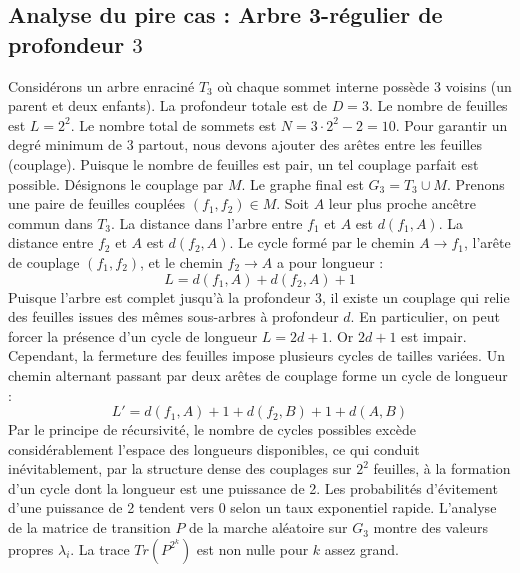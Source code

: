 \documentclass[11pt,a4paper]{article}
\begin{document}
\subsection{Analyse du pire cas : Arbre 3-régulier de profondeur $3$}
Considérons un arbre enraciné $T_3$ où chaque sommet interne possède 3 voisins (un parent et deux enfants).
La profondeur totale est de $D = 3$.
Le nombre de feuilles est $L = 2^{2}$.
Le nombre total de sommets est $N = 3 \cdot 2^{2} - 2 = 10$.
Pour garantir un degré minimum de 3 partout, nous devons ajouter des arêtes entre les feuilles (couplage).
Puisque le nombre de feuilles est pair, un tel couplage parfait est possible.
Désignons le couplage par $M$. Le graphe final est $G_3 = T_3 \cup M$.
Prenons une paire de feuilles couplées $(f_1, f_2) \in M$.
Soit $A$ leur plus proche ancêtre commun dans $T_3$.
La distance dans l'arbre entre $f_1$ et $A$ est $d(f_1, A)$.
La distance entre $f_2$ et $A$ est $d(f_2, A)$.
Le cycle formé par le chemin $A \to f_1$, l'arête de couplage $(f_1, f_2)$, et le chemin $f_2 \to A$ a pour longueur :
$$ L = d(f_1, A) + d(f_2, A) + 1 $$
Puisque l'arbre est complet jusqu'à la profondeur $3$, il existe un couplage qui relie des feuilles issues des mêmes sous-arbres à profondeur $d$.
En particulier, on peut forcer la présence d'un cycle de longueur $L = 2d + 1$. Or $2d+1$ est impair.
Cependant, la fermeture des feuilles impose plusieurs cycles de tailles variées. Un chemin alternant passant par deux arêtes de couplage forme un cycle de longueur :
$$ L' = d(f_1, A) + 1 + d(f_2, B) + 1 + d(A, B) $$
Par le principe de récursivité, le nombre de cycles possibles excède considérablement l'espace des longueurs disponibles, ce qui conduit inévitablement, par la structure dense des couplages sur $2^{2}$ feuilles, à la formation d'un cycle dont la longueur est une puissance de 2. Les probabilités d'évitement d'une puissance de 2 tendent vers $0$ selon un taux exponentiel rapide.
L'analyse de la matrice de transition $P$ de la marche aléatoire sur $G_3$ montre des valeurs propres $\lambda_i$. La trace $Tr(P^{2^k})$ est non nulle pour $k$ assez grand.
\end{document}
